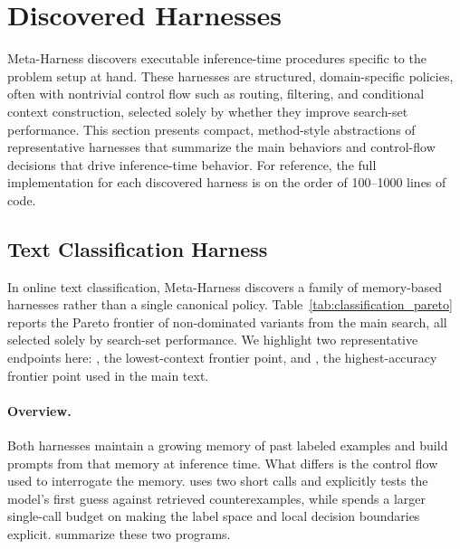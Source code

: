 \section{Discovered Harnesses}
\label{app:discovered-harnesses}

Meta-Harness discovers executable inference-time procedures specific to the problem setup at hand.
These harnesses are structured, domain-specific policies, often with nontrivial control flow such as routing, filtering, and conditional context construction, selected solely by whether they improve search-set performance.
This section presents compact, method-style abstractions of representative harnesses that summarize the main behaviors and control-flow decisions that drive inference-time behavior.
For reference, the full implementation for each discovered harness is on the order of 100--1000 lines of code.

\subsection{Text Classification Harness}
\label{app:classification-harnesses}

In online text classification, Meta-Harness discovers a family of memory-based harnesses rather than a single canonical policy.
Table~\ref{tab:classification_pareto} reports the Pareto frontier of non-dominated variants from the main search, all selected solely by search-set performance.
We highlight two representative endpoints here: , the lowest-context frontier point, and , the highest-accuracy frontier point used in the main text.

\paragraph{Overview.}
Both harnesses maintain a growing memory of past labeled examples and build prompts from that memory at inference time.
What differs is the control flow used to interrogate the memory.
 uses two short calls and explicitly tests the model's first guess against retrieved counterexamples, while  spends a larger single-call budget on making the label space and local decision boundaries explicit.
 summarize these two programs.

